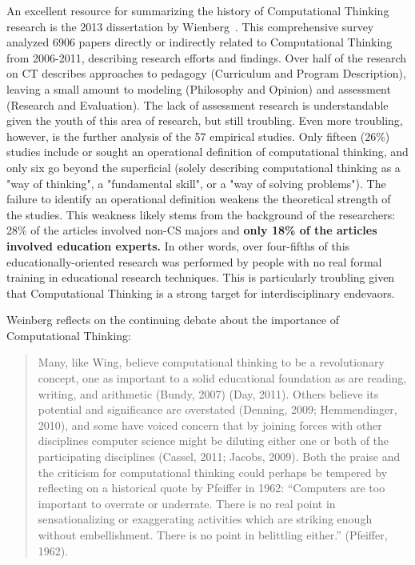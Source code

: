 An excellent resource for summarizing the history of Computational Thinking research is the 2013 dissertation by Wienberg~\cite{weinberg2013}. 
This comprehensive survey analyzed 6906 papers directly or indirectly related to Computational Thinking from 2006-2011, describing research efforts and findings.     
Over half of the research on CT describes approaches to pedagogy (Curriculum and Program Description), leaving a small amount to modeling (Philosophy and Opinion) and assessment (Research and Evaluation). 
The lack of assessment research is understandable given the youth of this area of research, but still troubling.
Even more troubling, however, is the further analysis of the 57 empirical studies.
Only fifteen (26\%) studies include or sought an operational definition of computational thinking, and only six go beyond the superficial (solely describing computational thinking as a "way of thinking", a "fundamental skill", or a "way of solving problems"). 
The failure to identify an operational definition weakens the theoretical strength of the studies.
This weakness likely stems from the background of the researchers: 28\% of the articles involved non-CS majors and \textbf{only 18\% of the articles involved education experts.} 
In other words, over four-fifths of this educationally-oriented research was performed by people with no real formal training in educational research techniques.
This is particularly troubling given that Computational Thinking is a strong target for interdisciplinary endevaors.

Weinberg reflects on the continuing debate about the importance of Computational Thinking:
\begin{quote}
    Many, like Wing, believe computational thinking to be a revolutionary concept, one as 
important to a solid educational foundation as are reading, writing, and arithmetic (Bundy, 2007\cite{bundy2007}) 
(Day, 2011\cite{day2011}). Others believe its potential and significance are overstated (Denning, 2009\cite{denning2009}; 
Hemmendinger, 2010\cite{hemmendinger2010}), and some have voiced concern that by joining forces with other 
disciplines computer science might be diluting either one or both of the participating disciplines 
(Cassel, 2011\cite{cassel2011}; Jacobs, 2009\cite{jacobs2009}). Both the praise and the criticism for computational thinking could 
perhaps be tempered by reflecting on a historical quote by Pfeiffer in 1962: “Computers are too 
important to overrate or underrate. There is no real point in sensationalizing or exaggerating 
activities which are striking enough without embellishment. There is no point in belittling 
either.” (Pfeiffer, 1962\cite{pfeiffer1962}).
\end{quote}

